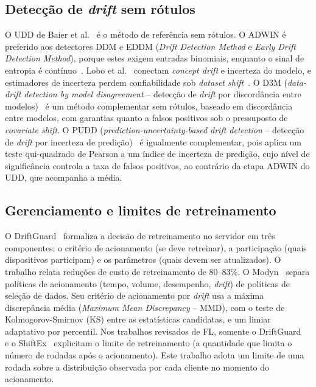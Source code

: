 \documentclass[conference]{IEEEtran}
\begin{document}
\subsection{Detecção de \textit{drift} sem rótulos}
O UDD de Baier et al.~\cite{baier2023} é o método de referência sem rótulos. O ADWIN é preferido aos detectores DDM e EDDM (\textit{Drift Detection Method} e \textit{Early Drift Detection Method}), porque estes exigem entradas binomiais, enquanto o sinal de entropia é contínuo~\cite{baier2023}. Lobo et al.~\cite{lobo2023} conectam \textit{concept drift} e incerteza do modelo, e estimadores de incerteza perdem confiabilidade sob \textit{dataset shift}~\cite{ovadia2019}. O D3M (\textit{data-drift detection by model disagreement} -- detecção de \textit{drift} por discordância entre modelos)~\cite{nguyen2025} é um método complementar sem rótulos, baseado em discordância entre modelos, com garantias quanto a falsos positivos sob o pressuposto de \textit{covariate shift}. O PUDD (\textit{prediction-uncertainty-based drift detection} -- detecção de \textit{drift} por incerteza de predição)~\cite{lu2025} é igualmente complementar, pois aplica um teste qui-quadrado de Pearson a um índice de incerteza de predição, cujo nível de significância controla a taxa de falsos positivos, ao contrário da etapa ADWIN do UDD, que acompanha a média.

\subsection{Gerenciamento e limites de retreinamento}
O DriftGuard~\cite{han2026} formaliza a decisão de retreinamento no servidor em três componentes: o critério de acionamento (se deve retreinar), a participação (quais dispositivos participam) e os parâmetros (quais devem ser atualizados). O trabalho relata reduções de custo de retreinamento de 80--83\%. O Modyn~\cite{bother2025} separa políticas de acionamento (tempo, volume, desempenho, \textit{drift}) de políticas de seleção de dados. Seu critério de acionamento por \textit{drift} usa a máxima discrepância média (\textit{Maximum Mean Discrepancy} -- MMD), com o teste de Kolmogorov-Smirnov (KS) entre as estatísticas candidatas, e um limiar adaptativo por percentil. Nos trabalhos revisados de FL, somente o DriftGuard~\cite{han2026} e o ShiftEx~\cite{bhope2025} explicitam o limite de retreinamento (a quantidade que limita o número de rodadas após o acionamento). Este trabalho adota um limite de uma rodada sobre a distribuição observada por cada cliente no momento do acionamento.
\end{document}
